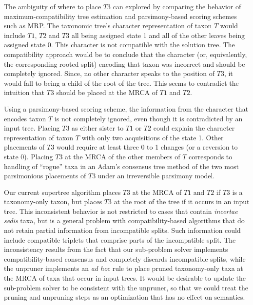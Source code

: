 \documentclass[english]{article}
\begin{document}
The ambiguity of where to place $T3$ can explored by comparing the
behavior of maximum-compatibility tree estimation and parsimony-based
scoring schemes such as MRP. The taxonomic tree's character
representation of taxon $T$ would include $T1$, $T2$ and $T3$ 
all being assigned state 1 and all of the other leaves being assigned 
state 0.  This character is not compatible with the solution tree. 
The compatibility approach would be to conclude that the character
(or, equivalently, the corresponding rooted split) encoding that taxon was incorrect and should be completely ignored.
Since, no other character speaks to the position of $T3$, it would
fall to being  a child of the root of the tree.  This seems to
contradict the intuition that $T3$ should be placed at the MRCA of
$T1$ and $T2$.

Using a parsimony-based scoring scheme, the information from the
character that encodes taxon $T$ is not completely ignored, even though it
is contradicted by an input tree.  Placing $T3$ as either sister to
$T1$ or $T2$ could explain the character representation of taxon $T$
with only two acquisitions of the state 1. Other placements of $T3$
would require at least three 0 to 1 changes (or a reversion to state
0). Placing $T3$ at the MRCA of the other members of $T$ corresponds
to handling of ``rogue'' taxa in an Adam's consensus tree
\citep{Adams1972} method of the two  most parsimonious placements of
$T3$ under an irreversible parsimony model. 

Our current supertree algorithm places $T3$ at the MRCA of $T1$ and
$T2$ if $T3$ is a taxonomy-only taxon, but places $T3$ at the root
of the tree if it occurs in an input tree.  This inconsistent behavior
is not restricted to cases that contain \emph{incertae sedis} taxa, but is a
general problem with compatibility-based algorithms that do not retain
partial information from incompatible splits.  Such information could
include compatible triplets that comprise parts of the incompatible split.
The inconsistency results from the fact that our sub-problem solver
implements compatibility-based consensus and completely discards
incompatible splits, while the unpruner implements an \emph{ad hoc}
rule to place pruned taxonomy-only taxa at the MRCA of taxa that occur
in input trees.  It would be desirable to update the sub-problem
solver to be consistent with the unpruner, so that we could treat the
pruning and unpruning steps as an optimization that has no effect on
semantics.
\end{document}
